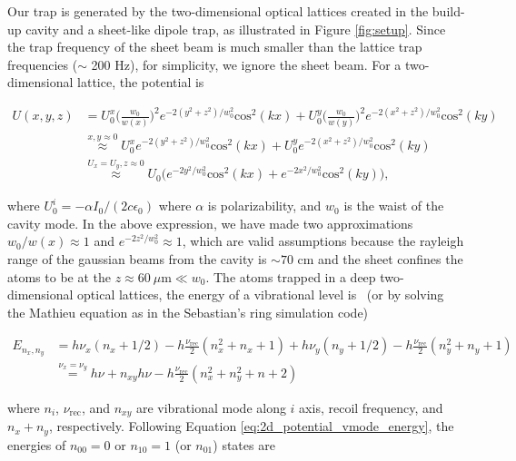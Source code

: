 \documentclass[bibnotes]{article}
\begin{document}
	Our trap is generated by the two-dimensional optical lattices created in the build-up cavity and a sheet-like dipole trap, as illustrated in Figure \ref{fig:setup}. Since the trap frequency of the sheet beam is much smaller than the lattice trap frequencies ($\sim$ 200 Hz), for simplicity, we ignore the sheet beam. For a two-dimensional lattice, the potential is

	\begin{align}
	U(x,y,z)&=U^{x}_{0}\bigg(\frac{w_{0}}{w(x)}\bigg)^{2}e^{-2(y^{2}+z^{2})/w^{2}_{0}}\text{cos}^{2}(kx)+U^{y}_{0}\bigg(\frac{w_{0}}{w(y)}\bigg)^{2}e^{-2(x^{2}+z^{2})/w^{2}_{0}}\text{cos}^{2}(ky) \nonumber \\
	&\stackrel{x,y \approx 0}{\approx} U^{x}_{0}e^{-2(y^{2}+z^{2})/w^{2}_{0}}\text{cos}^{2}(kx)+U^{y}_{0}e^{-2(x^{2}+z^{2})/w^{2}_{0}}\text{cos}^{2}(ky) \nonumber\\
	&\stackrel{U_{x}=U_{y}, z\approx{0}}{\approx} U_{0}\bigg(e^{-2y^{2}/w^{2}_{0}}\text{cos}^{2}(kx)+e^{-2x^{2}/w^{2}_{0}}\text{cos}^{2}(ky)\bigg),
	\label{eq:2d_potential}
	\end{align}

	\noindent where $U^{i}_{0} = - \alpha I_{0} / (2c\epsilon_{0})$ where $\alpha$ is polarizability, and $w_{0}$ is the waist of the cavity mode. In the above expression, we have made two approximations $w_{0}/w(x)\approx1$ and $e^{-2z^{2}/w^{2}_{0}}\approx 1$, which are valid assumptions because the rayleigh range of the gaussian beams from the cavity is $\sim 70$ cm and the sheet confines the atoms to be at the $z\approx 60 \ \mu \text{m} \ll  w_{0}$. The atoms trapped in a deep two-dimensional optical lattices, the energy of a vibrational level is~\cite{blatt09} (or by solving the Mathieu equation as in the Sebastian's ring simulation code)

	\begin{align}\label{eq:2d_potential_vmode_energy}
	E_{n_x,n_y}&=h\nu_{x}(n_{x}+1/2)-h\frac{\nu_{\text{rec}}}{2}(n^{2}_{x}+n_{x}+1)
	+h\nu_{y}(n_{y}+1/2)-h\frac{\nu_{\text{rec}}}{2}(n^{2}_{y}+n_{y}+1) \nonumber\\
	&\stackrel{\nu_x=\nu_y}=h\nu + n_{xy}h\nu - h\frac{\nu_{\text{rec}}}{2}(n^{2}_x+n^{2}_y+n+2)
	\end{align}

	\noindent where $n_{i}$, $\nu_{\text{rec}}$, and $n_{xy}$ are vibrational mode along $i$ axis, recoil frequency, and $n_x+n_y$, respectively. Following Equation \ref{eq:2d_potential_vmode_energy}, the energies of $n_{00}=0$ or $n_{10}=1$ (or $n_{01}$) states are
\end{document}
